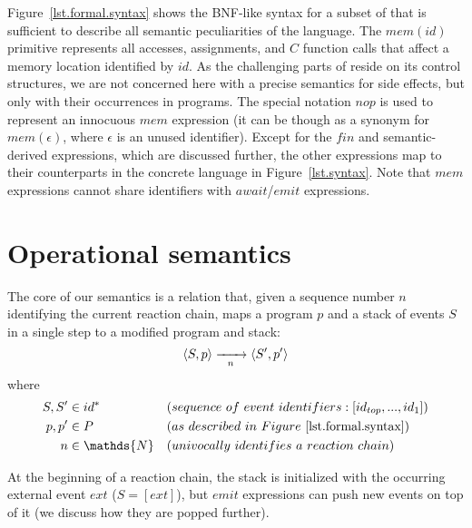 Figure~\ref{lst.formal.syntax} shows the BNF-like syntax for a subset of \CEU 
that is sufficient to describe all semantic peculiarities of the language.
%
The $mem(id)$ primitive represents all accesses, assignments, and $C$ function 
calls that affect a memory location identified by $id$.
As the challenging parts of \CEU reside on its control structures, we are not 
concerned here with a precise semantics for side effects, but only with their 
occurrences in programs.
%
The special notation $nop$ is used to represent an innocuous $mem$ expression 
(it can be though as a synonym for $mem(\epsilon)$, where $\epsilon$ is an 
unused identifier).
%
Except for the $fin$ and semantic-derived expressions, which are discussed 
further, the other expressions map to their counterparts in the concrete 
language in Figure~\ref{lst.syntax}.
%
Note that $mem$ expressions cannot share identifiers with $await$/$emit$ 
expressions.

\section{Operational semantics}
\label{sec.sem}

The core of our semantics is a relation that, given a sequence number $n$ 
identifying the current reaction chain, maps a program $p$ and a stack of 
events $S$ in a single step to a modified program and stack:
%
$$
\langle S, p \rangle
    \xrightarrow[~~n~~]{}
\langle S', p' \rangle
$$
%
where
%
\begin{align*}
S, S' &\in id^*
    &&(sequence~of~event~identifiers: [id_{top}, ..., id_1]) \\
p, p' &\in P
    && (as~described~in~Figure~\ref{lst.formal.syntax}) \\
n     &\in \mathds{N}
    && (univocally~identifies~a~reaction~chain)
\end{align*}

At the beginning of a reaction chain, the stack is initialized with the 
occurring external event $ext$ ($S=[ext]$), but $emit$ expressions can push new 
events on top of it (we discuss how they are popped further).

%
%

